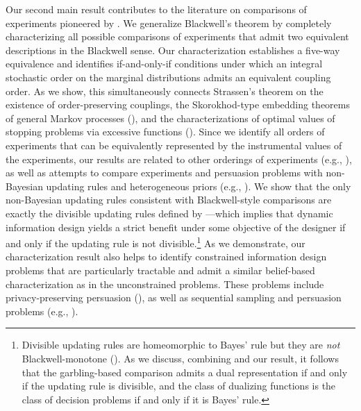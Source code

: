 \documentclass[12pt,letterpaper]{article}
\newenvironment{original}{\color{black}}{}
\theoremstyle{plain}
\theoremstyle{definition}
\theoremstyle{remark}
\theoremstyle{definition}
\begin{document}
\begin{original}
Our second main result contributes to the literature on comparisons of experiments pioneered by \citet{Blackwell1951Comparison}. We generalize Blackwell's theorem by completely characterizing all possible comparisons of experiments that admit two equivalent descriptions in the Blackwell sense. Our characterization establishes a five-way equivalence and identifies if-and-only-if conditions under which an integral stochastic order on the marginal distributions admits an equivalent coupling order. As we show, this simultaneously connects Strassen's theorem on the existence of order-preserving couplings, the Skorokhod-type embedding theorems of general Markov processes (\citealt{rost1971stopping}), and the characterizations of optimal values of stopping problems via excessive functions (\citealt{dynkin1963optimal}). Since we identify all orders of experiments that can be equivalently represented by the instrumental values of the experiments, our results are related to other orderings of experiments (e.g., \citealt[][]{Lehmann,chen2025experiments}), as well as attempts to compare experiments and persuasion problems with non-Bayesian updating rules and heterogeneous priors (e.g., \citealt[][]{alonso2016bayesian,de2022non,kobayashi2025dynamic,azrieli2025sequential}). We show that the only non-Bayesian updating rules consistent with Blackwell-style comparisons are exactly the divisible updating rules defined by \citet{cripps2018divisible}---which implies that dynamic information design yields a strict benefit under some objective of the designer if and only if the updating rule is not divisible.\footnote{Divisible updating rules are homeomorphic to Bayes' rule but they are \textit{not} Blackwell-monotone (\citealt{whitmeyerforthcomingBlackwell}). As we discuss, combining \citet{whitmeyerforthcomingBlackwell} and our result, it follows that the garbling-based comparison admits a dual representation if and only if the updating rule is divisible, and the class of dualizing functions is the class of decision problems if and only if it is Bayes' rule.} As we demonstrate, our characterization result also helps to identify constrained information design problems that are particularly tractable and admit a similar belief-based characterization as in the unconstrained problems. These problems include privacy-preserving persuasion (\citealt*{strack2024privacy,he2024private}), as well as sequential sampling and persuasion problems (e.g., \citealt*[][]{Wald,henry2019research,morris2019wald,ball2021experimental,ni2023sequential}).
\end{original}
\end{document}
